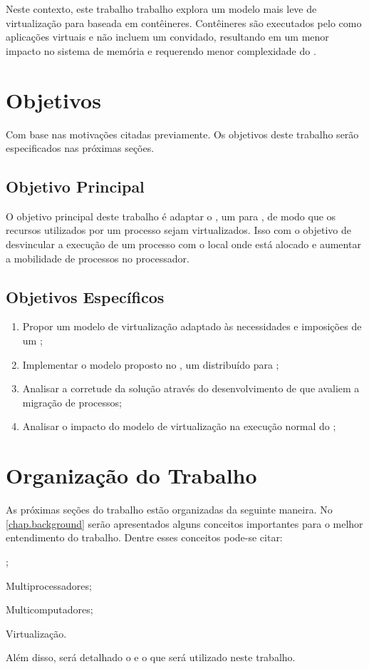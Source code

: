 Neste contexto, este trabalho trabalho explora um modelo mais leve de virtualização para \lw baseada em contêineres. Contêineres são executados pelo \os como aplicações virtuais e não incluem um \os convidado, resultando em um menor impacto no sistema de memória e requerendo menor complexidade do \hardware \cite{thalheim2018cntr, sharma2016containers}.

\glsresetall
\section{Objetivos}
\label{sec.goals}

Com base nas motivações citadas previamente. Os objetivos deste trabalho serão especificados nas próximas seções.

\subsection{Objetivo Principal}
\label{sec.goals.primary}

O objetivo principal deste trabalho é adaptar o \nanvix, um \os para \lws, de modo que os recursos utilizados por um processo sejam virtualizados. Isso com o objetivo de desvincular a execução de um processo com o local \ie \cluster onde está alocado e aumentar a mobilidade de processos no processador.

\subsection{Objetivos Específicos}
\label{sec.goals.secondary}

\begin{enumerate}[label= (\roman*)]
    \item Propor um modelo de virtualização adaptado às necessidades e imposições de um \lw;
    \item Implementar o modelo proposto no \nanvix, um \so distribuído para \lws;
    \item Analisar a corretude da solução através do desenvolvimento de \benchmarks que avaliem a migração de processos;
    \item Analisar o impacto do modelo de virtualização na execução normal do \nanvix;
\end{enumerate}

\section{Organização do Trabalho}
\label{sec.organization}

As próximas seções do trabalho estão organizadas da seguinte maneira. No \autoref{chap.background} serão apresentados alguns conceitos importantes para o melhor entendimento do trabalho. Dentre esses conceitos pode-se citar:
\begin{inlinelist}[label= (\roman*)]
    \item \Lws;
    \item Multiprocessadores;
    \item Multicomputadores;
    \item Virtualização.
\end{inlinelist}
Além disso, será detalhado o \os e o \lw que será utilizado neste trabalho.